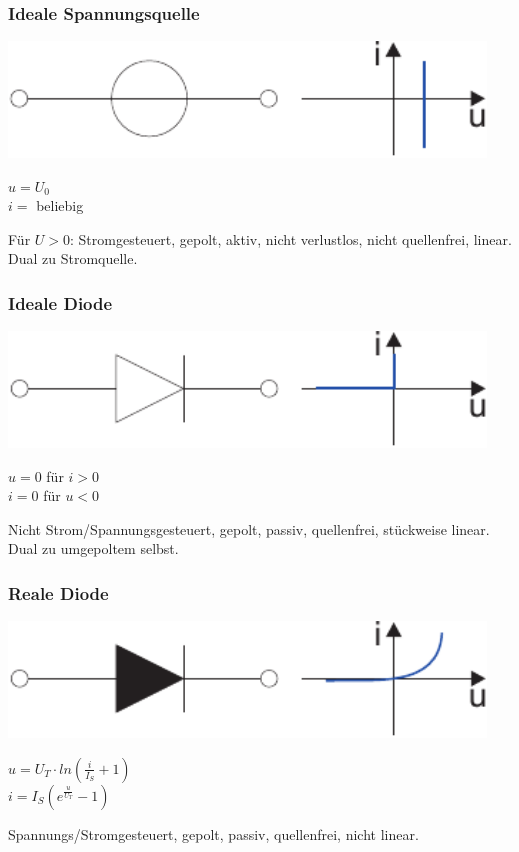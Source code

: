 \documentclass[a4paper,twocolumn,10pt]{article}
\begin{document}
\subsubsection*{Ideale Spannungsquelle}
\begin{minipage}[b]{0.26\textwidth}
\includegraphics[width=0.95\textwidth]{img/Spannungsquelle}
\end{minipage}
\hfill
\begin{minipage}[b]{0.2\textwidth}
$u=U_0$\\
$i=$ beliebig
\end{minipage}
Für $U>0$: Stromgesteuert, gepolt, aktiv, nicht verlustlos, nicht quellenfrei, linear. Dual zu Stromquelle.

\subsubsection*{Ideale Diode}
\begin{minipage}[b]{0.26\textwidth}
\includegraphics[width=0.95\textwidth]{img/IdealeDiode}
\end{minipage}
\hfill
\begin{minipage}[b]{0.2\textwidth}
$u=0$ für $i>0$\\
$i=0$ für $u<0$
\end{minipage}
Nicht Strom/Spannungsgesteuert, gepolt, passiv, quellenfrei, stückweise linear. Dual zu umgepoltem selbst.

\subsubsection*{Reale Diode}
\begin{minipage}[b]{0.26\textwidth}
\includegraphics[width=0.95\textwidth]{img/RealeDiode}
\end{minipage}
\hfill
\begin{minipage}[b]{0.2\textwidth}
$u=U_T\cdot ln(\frac{i}{I_S}+1)$\\
$i=I_S(e^{\frac{u}{U_T}}-1)$
\end{minipage}
Spannungs/Stromgesteuert, gepolt, passiv, quellenfrei, nicht linear.
\end{document}
